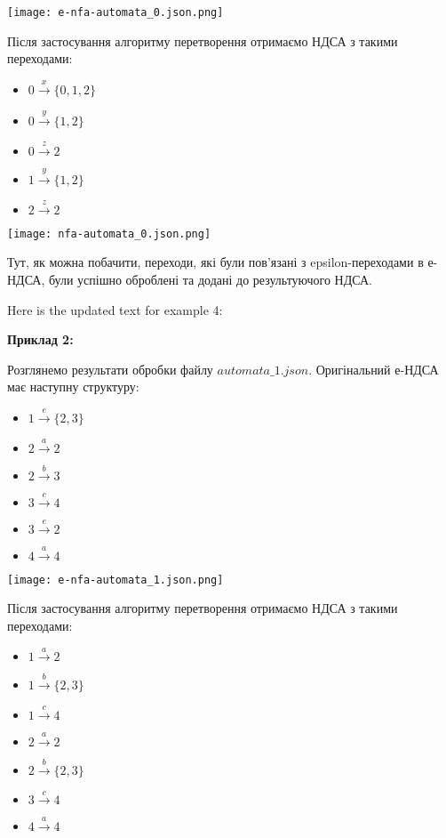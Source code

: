 \documentclass[12pt,a4paper]{article}
\begin{document}
\texttt{[image: e-nfa-automata\_0.json.png]}

Після застосування алгоритму перетворення отримаємо НДСА з такими переходами:
\begin{itemize}
    \item \(0 \xrightarrow{x} \{0, 1, 2\}\)
    \item \(0 \xrightarrow{y} \{1, 2\}\)
    \item \(0 \xrightarrow{z} 2\)
    \item \(1 \xrightarrow{y} \{1, 2\}\)
    \item \(2 \xrightarrow{z} 2\)
\end{itemize}

\texttt{[image: nfa-automata\_0.json.png]}

Тут, як можна побачити, переходи, які були пов'язані з epsilon-переходами в е-НДСА, були успішно оброблені та додані до результуючого НДСА.

Here is the updated text for example 4:

\vspace{1em}
\textbf{Приклад 2:}
\vspace{0.5em}

Розглянемо результати обробки файлу \( automata\_1.json \). Оригінальний е-НДСА має наступну структуру:

\begin{itemize}
    \item \(1 \xrightarrow{e} \{2, 3\}\)
    \item \(2 \xrightarrow{a} 2\)
    \item \(2 \xrightarrow{b} 3\)
    \item \(3 \xrightarrow{c} 4\)
    \item \(3 \xrightarrow{e} 2\)
    \item \(4 \xrightarrow{a} 4\)
\end{itemize}

\texttt{[image: e-nfa-automata\_1.json.png]}

Після застосування алгоритму перетворення отримаємо НДСА з такими переходами:
\begin{itemize}
    \item \(1 \xrightarrow{a} 2\)
    \item \(1 \xrightarrow{b} \{2, 3\}\)
    \item \(1 \xrightarrow{c} 4\)
    \item \(2 \xrightarrow{a} 2\)
    \item \(2 \xrightarrow{b} \{2, 3\}\)
    \item \(3 \xrightarrow{c} 4\)
    \item \(4 \xrightarrow{a} 4\)
\end{itemize}
\end{document}
